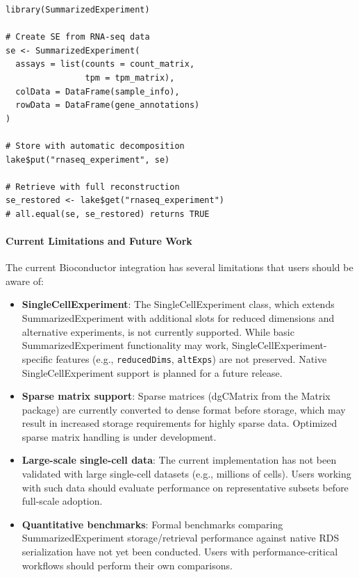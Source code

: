 \documentclass[11pt,a4paper]{article}
\begin{document}
\begin{lstlisting}[caption={Storing and retrieving SummarizedExperiment objects}]
library(SummarizedExperiment)

# Create SE from RNA-seq data
se <- SummarizedExperiment(
  assays = list(counts = count_matrix,
                tpm = tpm_matrix),
  colData = DataFrame(sample_info),
  rowData = DataFrame(gene_annotations)
)

# Store with automatic decomposition
lake$put("rnaseq_experiment", se)

# Retrieve with full reconstruction
se_restored <- lake$get("rnaseq_experiment")
# all.equal(se, se_restored) returns TRUE
\end{lstlisting}

\paragraph{Current Limitations and Future Work}
The current Bioconductor integration has several limitations that users should be aware of:

\begin{itemize}
    \item \textbf{SingleCellExperiment}: The SingleCellExperiment class, which extends SummarizedExperiment with additional slots for reduced dimensions and alternative experiments, is not currently supported. While basic SummarizedExperiment functionality may work, SingleCellExperiment-specific features (e.g., \texttt{reducedDims}, \texttt{altExps}) are not preserved. Native SingleCellExperiment support is planned for a future release.
    \item \textbf{Sparse matrix support}: Sparse matrices (dgCMatrix from the Matrix package) are currently converted to dense format before storage, which may result in increased storage requirements for highly sparse data. Optimized sparse matrix handling is under development.
    \item \textbf{Large-scale single-cell data}: The current implementation has not been validated with large single-cell datasets (e.g., millions of cells). Users working with such data should evaluate performance on representative subsets before full-scale adoption.
    \item \textbf{Quantitative benchmarks}: Formal benchmarks comparing SummarizedExperiment storage/retrieval performance against native RDS serialization have not yet been conducted. Users with performance-critical workflows should perform their own comparisons.
\end{itemize}
\end{document}
